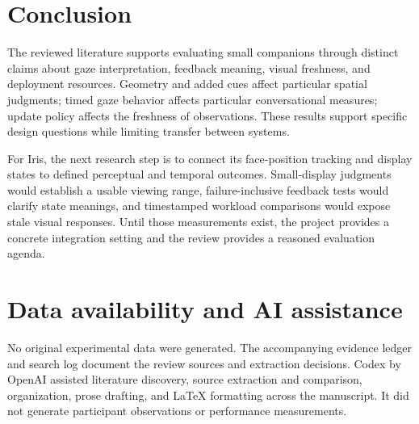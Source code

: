 \documentclass[journal]{IEEEtran}
\begin{document}
\section{Conclusion}
The reviewed literature supports evaluating small companions through distinct claims about gaze interpretation, feedback meaning, visual freshness, and deployment resources. Geometry and added cues affect particular spatial judgments; timed gaze behavior affects particular conversational measures; update policy affects the freshness of observations. These results support specific design questions while limiting transfer between systems.

For Iris, the next research step is to connect its face-position tracking and display states to defined perceptual and temporal outcomes. Small-display judgments would establish a usable viewing range, failure-inclusive feedback tests would clarify state meanings, and timestamped workload comparisons would expose stale visual responses. Until those measurements exist, the project provides a concrete integration setting and the review provides a reasoned evaluation agenda.

\section*{Data availability and AI assistance}
No original experimental data were generated. The accompanying evidence ledger and search log document the review sources and extraction decisions. Codex by OpenAI assisted literature discovery, source extraction and comparison, organization, prose drafting, and LaTeX formatting across the manuscript. It did not generate participant observations or performance measurements.
\end{document}
